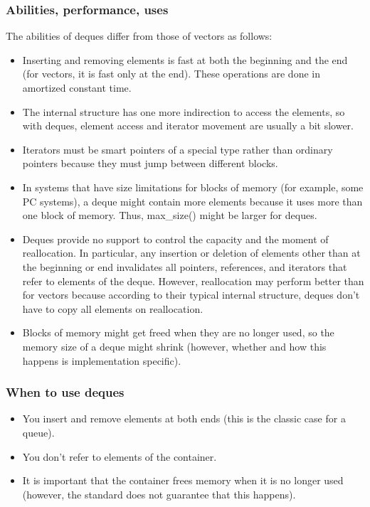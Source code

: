 \documentclass{report}
\begin{document}
    \subsubsection{Abilities, performance, uses}
    \bigbreak \noindent 
    The abilities of deques differ from those of vectors as follows:
    \begin{itemize}
        \item Inserting and removing elements is fast at both the beginning and the end (for vectors, it is fast only at the end). These operations are done in amortized constant time.
        \item The internal structure has one more indirection to access the elements, so with deques, element access and iterator movement are usually a bit slower.
        \item Iterators must be smart pointers of a special type rather than ordinary pointers because they must jump between different blocks.
        \item In systems that have size limitations for blocks of memory (for example, some PC systems), a deque might contain more elements because it uses more than one block of memory. Thus, max\_size() might be larger for deques.
        \item Deques provide no support to control the capacity and the moment of reallocation. In particular, any insertion or deletion of elements other than at the beginning or end invalidates all pointers, references, and iterators that refer to elements of the deque. However, reallocation may perform better than for vectors because according to their typical internal structure, deques don’t have to copy all elements on reallocation.
        \item Blocks of memory might get freed when they are no longer used, so the memory size of a deque might shrink (however, whether and how this happens is implementation specific).
    \end{itemize}

    \bigbreak \noindent 
    \subsubsection{When to use deques}
    \begin{itemize}
        \item You insert and remove elements at both ends (this is the classic case for a queue).
        \item You don’t refer to elements of the container.
        \item It is important that the container frees memory when it is no longer used (however, the standard does not guarantee that this happens).
    \end{itemize}
\end{document}
